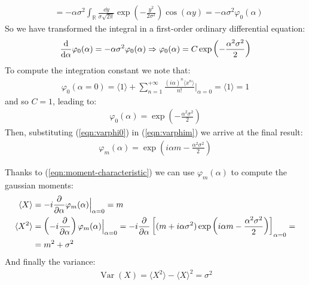 \documentclass[../template.tex]{subfiles}
\begin{document}
\begin{example}
\begin{align*}
        &= -\alpha\sigma^2 \int_{\mathbb{R}} \frac{\dd{y}}{\sigma \sqrt{2 \pi}}\exp\left(-\frac{y^2}{2 \sigma^2} \right) \cos(\alpha y) = -\alpha\sigma^2 \varphi_0(\alpha)
    \end{align*}
    So we have transformed the integral in a first-order ordinary differential equation:
    \begin{align*}
        \dv{\alpha} \varphi_0(\alpha) = - \alpha \sigma^2 \varphi_0(\alpha) \Rightarrow \varphi_0(\alpha) = C \exp\left(-\frac{\alpha^2 \sigma^2}{2} \right)
    \end{align*}
    To compute the integration constant we note that:
    \begin{align*}
        \varphi_0(\alpha = 0) = \langle 1 \rangle + \sum_{n=1}^{+\infty} \frac{(i \alpha)^n \langle x^n \rangle}{n!} \Big|_{\alpha = 0} = \langle 1 \rangle = 1
    \end{align*}
    and so $C=1$, leading to:
    \begin{align}\label{eqn:varphi0}
        \varphi_0(\alpha) = \exp\left(-\frac{\alpha^2 \sigma^2}{2} \right)
    \end{align}
    Then, substituting (\ref{eqn:varphi0}) in (\ref{eqn:varphim}) we arrive at the final result:
    \begin{align*}
        \varphi_m(\alpha) = \exp(i \alpha m - \frac{\alpha^2 \sigma^2}{2} )
    \end{align*}

    Thanks to (\ref{eqn:moment-characteristic}) we can use $\varphi_m(\alpha)$ to compute the gaussian moments:
    \begin{align*}
        \langle X \rangle &= -i \pdv{\alpha} \varphi_{m}(\alpha) \Big|_{\alpha = 0} = m\\
        \langle X^2 \rangle &= \left(-i \pdv{\alpha}\right) \varphi_m(\alpha) \Big|_{\alpha=0} = -i\pdv{\alpha} \left[(m + i \alpha \sigma^2) \exp\left(i \alpha m - \frac{\alpha^2 \sigma^2}{2} \right)\right]_{\alpha = 0}=\\
        &= m^2 + \sigma^2
    \end{align*}
    And finally the variance:
    \begin{align*}
        \operatorname{Var}(X) = \langle X^2 \rangle - \langle X \rangle^2 = \sigma^2
    \end{align*}
\end{example}
\end{document}

